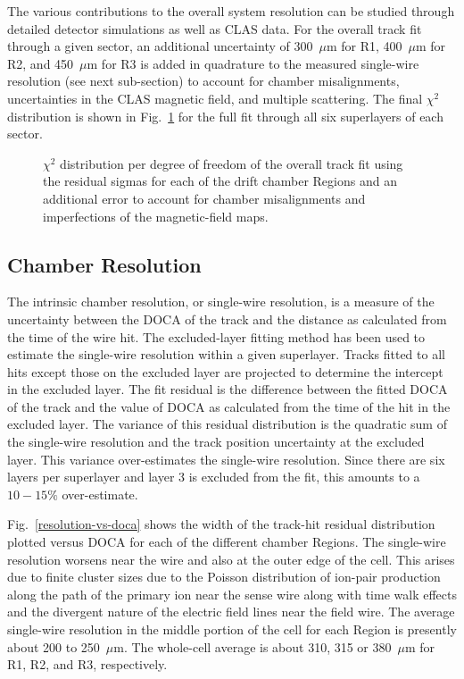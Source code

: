 The various contributions to the overall system resolution can be studied
through detailed detector simulations as well as CLAS data.  For the overall
track fit through a given sector, an additional uncertainty of 300~$\mu$m for 
R1, 400~$\mu$m for R2, and 450~$\mu$m for R3 is added in quadrature to the
measured single-wire resolution (see next sub-section) to account for chamber 
misalignments, uncertainties in the CLAS magnetic field, and multiple scattering.
The final $\chi^2$ distribution is shown in Fig.~\ref{chi2fit} for the 
full fit through all six superlayers of each sector.


\begin{figure}[htpb]
\vspace{5cm} 
\caption{\small{$\chi^2$ distribution per degree of freedom of the overall track 
fit using the residual sigmas for each of the drift chamber Regions and an 
additional error to account for chamber misalignments and imperfections of the
magnetic-field maps.}}
\label{chi2fit}
\end{figure}

\subsection{Chamber Resolution}

\hskip 0.15in
The intrinsic chamber resolution, or single-wire resolution, is a measure
of the uncertainty between the DOCA of the track and the distance as
calculated from the time of the wire hit.  The excluded-layer fitting method 
has been used to estimate the single-wire resolution within a given superlayer.  
Tracks fitted to all hits except those on the excluded layer are projected to 
determine the intercept in the excluded layer.  The fit residual is the difference 
between the fitted DOCA of the track and the value of DOCA as calculated from the 
time of the hit in the excluded layer.  The variance of this residual distribution 
is the quadratic sum of the single-wire resolution and the track position uncertainty 
at the excluded layer.  This variance over-estimates the single-wire resolution.
Since there are six layers per superlayer and layer 3 is excluded from the fit,
this amounts to a $10 - 15\%$ over-estimate.

Fig.~\ref{resolution-vs-doca} shows the width of the track-hit residual distribution plotted versus DOCA for 
each of the different chamber Regions.  The single-wire resolution worsens near the 
wire and also at the outer edge of the cell.  This arises due to finite cluster sizes 
due to the Poisson distribution of ion-pair production along the path of the primary ion 
near the sense wire along with time walk effects and the divergent nature of the electric
field lines near the field wire.  The average single-wire resolution in the middle 
portion of the cell for each Region is presently about 200 to 250~$\mu$m.  The whole-cell 
average is about 310, 315 or 380~$\mu$m for R1, R2, and R3, respectively.

